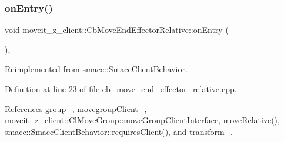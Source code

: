 \subsubsection{\texorpdfstring{on\+Entry()}{onEntry()}}
{\footnotesize\ttfamily void moveit\+\_\+z\+\_\+client\+::\+Cb\+Move\+End\+Effector\+Relative\+::on\+Entry (\begin{DoxyParamCaption}{ }\end{DoxyParamCaption})\hspace{0.3cm}{\ttfamily [override]}, {\ttfamily [virtual]}}



Reimplemented from \hyperlink{classsmacc_1_1SmaccClientBehavior_a7962382f93987c720ad432fef55b123f}{smacc\+::\+Smacc\+Client\+Behavior}.



Definition at line 23 of file cb\+\_\+move\+\_\+end\+\_\+effector\+\_\+relative.\+cpp.



References group\+\_\+, movegroup\+Client\+\_\+, moveit\+\_\+z\+\_\+client\+::\+Cl\+Move\+Group\+::move\+Group\+Client\+Interface, move\+Relative(), smacc\+::\+Smacc\+Client\+Behavior\+::requires\+Client(), and transform\+\_\+.


